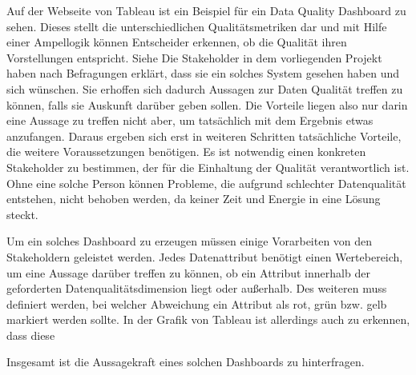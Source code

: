 Auf der Webseite von Tableau ist ein Beispiel für ein Data Quality Dashboard zu sehen. 
Dieses stellt die unterschiedlichen Qualitätsmetriken dar und mit Hilfe einer Ampellogik können Entscheider erkennen, ob die Qualität ihren Vorstellungen entspricht.
Siehe \cite{https://public.tableau.com/views/DataQualityDashboards/Dashboard1?:embed=y&:showVizHome=no&:display_count=y&:display_static_image=y&:bootstrapWhenNotified=true}
Die Stakeholder in dem vorliegenden Projekt haben nach Befragungen erklärt, dass sie ein solches System gesehen haben und sich wünschen. 
Sie erhoffen sich dadurch Aussagen zur Daten Qualität treffen zu können, falls sie Auskunft darüber geben sollen. 
Die Vorteile liegen also nur darin eine Aussage zu treffen nicht aber, um tatsächlich mit dem Ergebnis etwas anzufangen. 
Daraus ergeben sich erst in weiteren Schritten tatsächliche Vorteile, die weitere Voraussetzungen benötigen.
Es ist notwendig einen konkreten Stakeholder zu bestimmen, der für die Einhaltung der Qualität verantwortlich ist.
Ohne eine solche Person können Probleme, die aufgrund schlechter Datenqualität entstehen, nicht behoben werden, da keiner Zeit und Energie in eine Lösung steckt.

Um ein solches Dashboard zu erzeugen müssen einige Vorarbeiten von den Stakeholdern geleistet werden.
Jedes Datenattribut benötigt einen Wertebereich, um eine Aussage darüber treffen zu können, ob ein Attribut innerhalb der geforderten Datenqualitätsdimension liegt oder außerhalb.
Des weiteren muss definiert werden, bei welcher Abweichung ein Attribut als rot, grün bzw. gelb markiert werden sollte. 
In der Grafik von Tableau ist allerdings auch zu erkennen, dass diese 

Insgesamt ist die Aussagekraft eines solchen Dashboards zu hinterfragen. 

